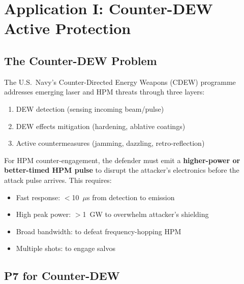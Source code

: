 \documentclass[11pt]{article}
\begin{document}
\section{Application I: Counter-DEW Active Protection}
\label{sec:counter-DEW}

\subsection{The Counter-DEW Problem}

The U.S.\ Navy's Counter-Directed Energy Weapons (CDEW) programme
addresses emerging laser and HPM threats through three layers:
\begin{enumerate}[nosep]
  \item DEW detection (sensing incoming beam/pulse)
  \item DEW effects mitigation (hardening, ablative coatings)
  \item Active countermeasures (jamming, dazzling, retro-reflection)
\end{enumerate}

For HPM counter-engagement, the defender must emit a \textbf{higher-power
or better-timed HPM pulse} to disrupt the attacker's electronics before
the attack pulse arrives. This requires:
\begin{itemize}[nosep]
  \item Fast response: $<$10~$\mu$s from detection to emission
  \item High peak power: $>$1~GW to overwhelm attacker's shielding
  \item Broad bandwidth: to defeat frequency-hopping HPM
  \item Multiple shots: to engage salvos
\end{itemize}

\subsection{P7 for Counter-DEW}
\end{document}
